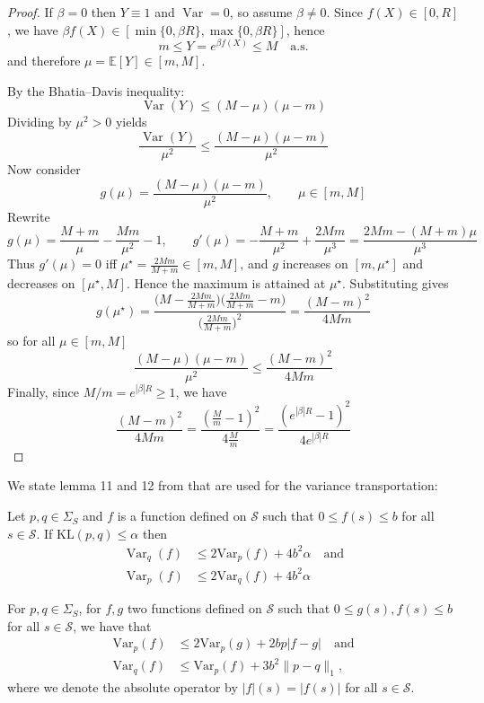 \documentclass[final,12pt]{colt2026} %
\begin{document}
\begin{proof}
If $\beta=0$ then $Y\equiv 1$ and $\operatorname{Var}=0$, so assume $\beta\neq 0$.
Since $f(X)\in[0,R]$, we have $\beta f(X)\in[\min\{0,\beta R\},\max\{0,\beta R\}]$, hence
$$
m \le Y=e^{\beta f(X)} \le M \quad\text{a.s.}
$$
and therefore $\mu=\mathbb E[Y]\in[m,M]$.

By the Bhatia--Davis inequality: 
$$
\operatorname{Var}(Y) \leq (M-\mu)(\mu-m)
$$
Dividing by $\mu^2>0$ yields 
$$
\frac{\operatorname{Var}(Y)}{\mu^2} \leq \frac{(M-\mu)(\mu-m)}{\mu^2}
$$
Now consider
$$
g(\mu)=\frac{(M-\mu)(\mu-m)}{\mu^2}, \qquad \mu\in[m,M]
$$
Rewrite
$$
g(\mu)=\frac{M+m}{\mu}-\frac{Mm}{\mu^2}-1,
\qquad
g'(\mu)= -\frac{M+m}{\mu^2}+\frac{2Mm}{\mu^3}
=\frac{2Mm-(M+m)\mu}{\mu^3}
$$
Thus $g'(\mu)=0$ iff $\mu^\star=\frac{2Mm}{M+m}\in[m,M]$, and $g$ increases on
$[m,\mu^\star]$ and decreases on $[\mu^\star,M]$. Hence the maximum is attained
at $\mu^\star$. Substituting gives
$$
g(\mu^\star)
=\frac{\bigl(M-\frac{2Mm}{M+m}\bigr)\bigl(\frac{2Mm}{M+m}-m\bigr)}
{\bigl(\frac{2Mm}{M+m}\bigr)^2}
=\frac{(M-m)^2}{4Mm}
$$
so for all $\mu\in[m,M]$
$$
\frac{(M-\mu)(\mu-m)}{\mu^2}\le \frac{(M-m)^2}{4Mm}
$$
Finally, since $M/m=e^{|\beta|R}\ge 1$, we have
$$
\frac{(M-m)^2}{4Mm}=\frac{\left(\frac{M}{m}-1\right)^2}{4\frac{M}{m}}
=\frac{(e^{|\beta|R}-1)^2}{4e^{|\beta|R}}
$$
\end{proof}
We state lemma 11 and 12 from \citep{Menard2021Fast} that are used for the variance transportation:
\begin{lemma}\label{KL transportation}
Let $p, q \in \Sigma_S$ and $f$ is a function defined on $\mathcal{S}$ such that $0 \le f(s) \le b$ for all $s \in \mathcal{S}$. If $\mathrm{KL}(p, q) \le \alpha$ then
\begin{align*}
\operatorname{Var}_q(f) &\le 2\mathrm{Var}_p(f) + 4b^2\alpha \quad \text{and} \\
\operatorname{Var}_p(f) &\le 2\mathrm{Var}_q(f) + 4b^2\alpha
\end{align*}
\end{lemma}
\begin{lemma}\label{transportation} For $p, q \in \Sigma_S$, for $f, g$ two functions defined on $\mathcal{S}$ such that $0 \le g(s), f(s) \le b$ for all $s \in \mathcal{S}$, we have that
\begin{align*}
\mathrm{Var}_p(f) &\le 2\mathrm{Var}_p(g) + 2bp|f - g| \quad \text{and} \\
\mathrm{Var}_q(f) &\le \mathrm{Var}_p(f) + 3b^2\|p - q\|_1,
\end{align*}
where we denote the absolute operator by $|f|(s) = |f(s)|$ for all $s \in \mathcal{S}$.
\end{lemma}
\end{document}
